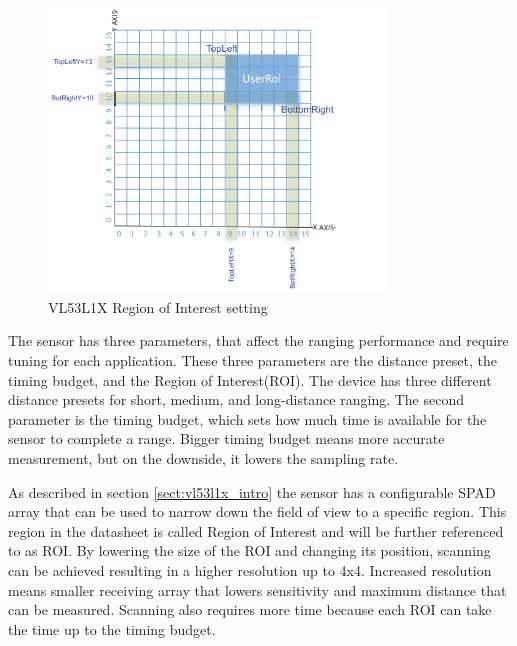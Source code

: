\begin{figure}[!hb]
    \centering
    \includegraphics[width=90mm, keepaspectratio]{figures/vl53l1x_roi_setup.png}
    \caption{VL53L1X Region of Interest setting \cite{VL53L1XApplicationNote}}
    \label{fig:vl53l1x_roi_setup}
\end{figure}

The sensor has three parameters, that affect the ranging performance and require tuning for each application.
These three parameters are the distance preset, the timing budget, and the Region of Interest(ROI). The device
has three different distance presets for short, medium, and long-distance ranging. The second parameter is the
timing budget, which sets how much time is available for the sensor to complete a range. Bigger
timing budget means more accurate measurement, but on the downside, it lowers the sampling rate.

As described in section \ref{sect:vl53l1x_intro} the sensor has a configurable SPAD array that can be used to
narrow down the field of view to a specific region. This region in the datasheet is called Region of Interest
and will be further referenced to as ROI. By lowering the size of the ROI and changing its position, scanning
can be achieved resulting in a higher resolution up to 4x4. Increased resolution means smaller receiving array
that lowers sensitivity and maximum distance that can be measured. Scanning also requires more time because
each ROI can take the time up to the timing budget.

